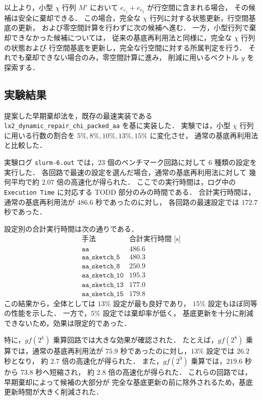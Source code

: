 以上より，小型 $\chi$ 行列 $M'$ において
$e_{c_1}+e_{c_2}$ が行空間に含まれる場合，
その候補は安全に棄却できる．
この場合，完全な $\chi$ 行列に対する状態更新，行空間基底の更新，
および零空間計算を行わずに次の候補へ進む．
一方，小型行列で棄却できなかった候補については，
従来の基底再利用法と同様に，完全な $\chi$ 行列の状態および
行空間基底を更新し，完全な行空間に対する所属判定を行う．
それでも棄却できない場合のみ，零空間計算に進み，
削減に用いるベクトル $y$ を探索する．

\subsection{実験結果}

提案した早期棄却法を，既存の最速実装である
\texttt{lx2\_dynamic\_repair\_chi\_packed\_aa}
を基に実装した．
実験では，小型 $\chi$ 行列に用いる行数の割合を
$5\%,8\%,10\%,13\%,15\%$ に変化させ，
通常の基底再利用法と比較した．

実験ログ \texttt{slurm-6.out} では，23 個のベンチマーク回路に対して
6 種類の設定を実行した．
各回路で最速の設定を選んだ場合，通常の基底再利用法に対して
幾何平均で約 $2.07$ 倍の高速化が得られた．
ここでの実行時間は，ログ中の \texttt{Execution Time} に対応する
TODD 部分のみの時間である．
合計実行時間は，通常の基底再利用法が $486.6$ 秒であったのに対し，
各回路の最速設定では $172.7$ 秒であった．

設定別の合計実行時間は次の通りである．
\[
\begin{array}{c|c}
\text{手法} & \text{合計実行時間 [s]} \\
\hline
\texttt{aa} & 486.6 \\
\texttt{aa\_sketch\_5} & 480.3 \\
\texttt{aa\_sketch\_8} & 250.9 \\
\texttt{aa\_sketch\_10} & 195.3 \\
\texttt{aa\_sketch\_13} & 177.0 \\
\texttt{aa\_sketch\_15} & 179.8
\end{array}
\]
この結果から，全体としては $13\%$ 設定が最も良好であり，
$15\%$ 設定もほぼ同等の性能を示した．
一方で，$5\%$ 設定では棄却率が低く，
基底更新を十分に削減できないため，効果は限定的であった．

特に，$gf(2^k)$ 乗算回路では大きな効果が確認された．
たとえば，$gf(2^8)$ 乗算では，通常の基底再利用法が
$75.9$ 秒であったのに対し，$13\%$ 設定では $26.2$ 秒となり，
約 $2.7$ 倍の高速化が得られた．
また，$gf(2^9)$ 乗算では，$219.6$ 秒から $73.8$ 秒へ短縮され，
約 $2.8$ 倍の高速化が得られた．
これらの回路では，早期棄却によって候補の大部分が
完全な基底更新の前に除外されるため，基底更新時間が大きく削減された．

